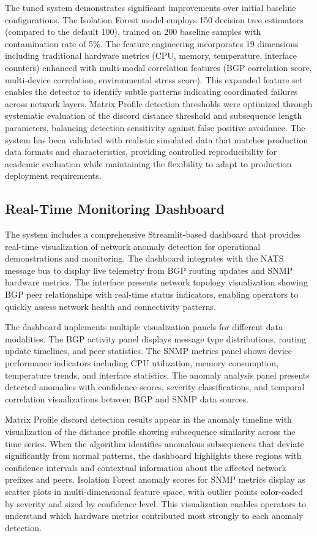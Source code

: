 \documentclass[11pt]{article}
\begin{document}
The tuned system demonstrates significant improvements over initial baseline configurations. The Isolation Forest model employs 150 decision tree estimators (compared to the default 100), trained on 200 baseline samples with contamination rate of 5\%. The feature engineering incorporates 19 dimensions including traditional hardware metrics (CPU, memory, temperature, interface counters) enhanced with multi-modal correlation features (BGP correlation score, multi-device correlation, environmental stress score). This expanded feature set enables the detector to identify subtle patterns indicating coordinated failures across network layers. Matrix Profile detection thresholds were optimized through systematic evaluation of the discord distance threshold and subsequence length parameters, balancing detection sensitivity against false positive avoidance. The system has been validated with realistic simulated data that matches production data formats and characteristics, providing controlled reproducibility for academic evaluation while maintaining the flexibility to adapt to production deployment requirements.

\subsection{Real-Time Monitoring Dashboard}

The system includes a comprehensive Streamlit-based dashboard that provides real-time visualization of network anomaly detection for operational demonstrations and monitoring. The dashboard integrates with the NATS message bus to display live telemetry from BGP routing updates and SNMP hardware metrics. The interface presents network topology visualization showing BGP peer relationships with real-time status indicators, enabling operators to quickly assess network health and connectivity patterns.

The dashboard implements multiple visualization panels for different data modalities. The BGP activity panel displays message type distributions, routing update timelines, and peer statistics. The SNMP metrics panel shows device performance indicators including CPU utilization, memory consumption, temperature trends, and interface statistics. The anomaly analysis panel presents detected anomalies with confidence scores, severity classifications, and temporal correlation visualizations between BGP and SNMP data sources.

Matrix Profile discord detection results appear in the anomaly timeline with visualization of the distance profile showing subsequence similarity across the time series. When the algorithm identifies anomalous subsequences that deviate significantly from normal patterns, the dashboard highlights these regions with confidence intervals and contextual information about the affected network prefixes and peers. Isolation Forest anomaly scores for SNMP metrics display as scatter plots in multi-dimensional feature space, with outlier points color-coded by severity and sized by confidence level. This visualization enables operators to understand which hardware metrics contributed most strongly to each anomaly detection.
\end{document}
